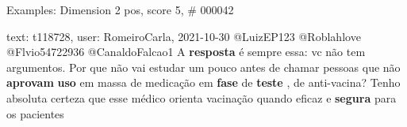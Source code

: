 \begin{frame}{Examples: Dimension 2 pos, score 5, \# 000042}
\footnotesize
\begin{exampleblock}{text: t118728, user: RomeiroCarla, 2021-10-30}
@LuizEP123 @Roblahlove @Flvio54722936 @CanaldoFalcao1 A \textbf{resposta} é 
sempre essa: vc não tem argumentos. Por que não vai estudar um pouco antes de 
chamar pessoas que não \textbf{aprovam} \textbf{uso} em massa de medicação em 
\textbf{fase} de \textbf{teste} , de anti-vacina? Tenho absoluta certeza que 
esse médico orienta vacinação quando eficaz e \textbf{segura} para os pacientes 
\end{exampleblock}
\end{frame}
